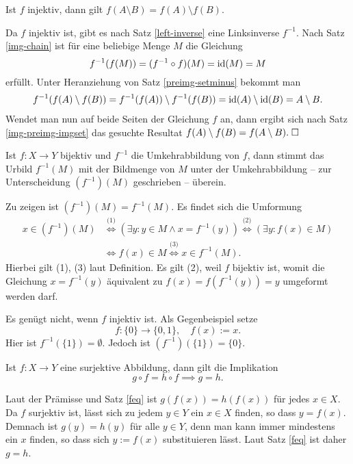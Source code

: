 \begin{Satz}\label{inj-img-setminus}
Ist $f$ injektiv, dann gilt $f(A\setminus B)=f(A)\setminus f(B)$.
\end{Satz}
\begin{Beweis}
Da $f$ injektiv ist, gibt es nach Satz \ref{left-inverse} eine
Linksinverse $f^{-1}$. Nach Satz \ref{img-chain} ist für eine
beliebige Menge $M$ die Gleichung
\[f^{-1}(f(M)) = (f^{-1}\circ f)(M) = \operatorname{id}(M) = M\]
erfüllt. Unter Heranziehung von Satz \ref{preimg-setminus}
bekommt man
\begin{gather*}
f^{-1}(f(A)\setminus f(B)) = f^{-1}(f(A))\setminus f^{-1}(f(B))
= \operatorname{id}(A)\setminus\operatorname{id}(B) = A\setminus B.
\end{gather*}
Wendet man nun auf beide Seiten der Gleichung $f$ an, dann ergibt
sich nach Satz \ref{img-preimg-imgset} das gesuchte Resultat
$f(A)\setminus f(B) = f(A\setminus B).\;\square$
\end{Beweis}

\begin{Satz}
Ist $f\colon X\to Y$ bijektiv und $f^{-1}$ die
Umkehrabbildung von $f$, dann stimmt das Urbild $f^{-1}(M)$ mit der Bildmenge
von $M$ unter der Umkehrabbildung -- zur Unterscheidung $(f^{-1})(M)$
geschrieben -- überein.
\end{Satz}
\begin{Beweis}
Zu zeigen ist $(f^{-1})(M) = f^{-1}(M)$. Es findet sich die Umformung
\begin{align*}
x\in (f^{-1})(M) &\stackrel{\text{(1)}}\iff (\exists y\colon y\in M\land x=f^{-1}(y))
\stackrel{\text{(2)}}\iff (\exists y\colon f(x)\in M)\\
&\iff f(x)\in M\stackrel{\text{(3)}}\iff x\in f^{-1}(M).
\end{align*}
Hierbei gilt (1), (3) laut Definition. Es gilt (2), weil $f$ bijektiv
ist, womit die Gleichung $x=f^{-1}(y)$ äquivalent zu
$f(x)=f(f^{-1}(y))=y$ umgeformt werden darf.\,\qedsymbol
\end{Beweis}
Es genügt nicht, wenn $f$ injektiv ist. Als Gegenbeispiel setze
\[f\colon\{0\}\to\{0,1\},\quad f(x):=x.\]
Hier ist $f^{-1}(\{1\})=\emptyset$. Jedoch ist
$(f^{-1})(\{1\})=\{0\}$.

\begin{Satz}%
\label{right-cancellative}\newlinefirst
Ist $f\colon X\to Y$ eine surjektive Abbildung, dann gilt die Implikation
\[g\circ f = h\circ f \implies g=h.\]
\end{Satz}
\begin{Beweis}
Laut der Prämisse und Satz \ref{feq} ist $g(f(x)) = h(f(x))$
für jedes $x\in X$. Da $f$ surjektiv ist, lässt sich zu
jedem $y\in Y$ ein $x\in X$ finden, so dass $y=f(x)$. Demnach ist
$g(y)=h(y)$ für alle $y\in Y$, denn man kann immer mindestens
ein $x$ finden, so dass sich $y:=f(x)$ substituieren lässt.
Laut Satz \ref{feq} ist daher $g=h$.\;\qedsymbol
\end{Beweis}

